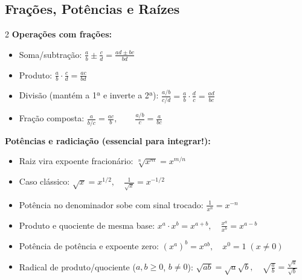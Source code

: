 \documentclass[10pt,a4paper]{article}
\begin{document}
\subsection{Frações, Potências e Raízes}
\begin{multicols}{2}
\textbf{Operações com frações:}
\begin{itemize}
    \item Soma/subtração: $\displaystyle \frac{a}{b} \pm \frac{c}{d} = \frac{ad \pm bc}{bd}$
    \item Produto: $\displaystyle \frac{a}{b} \cdot \frac{c}{d} = \frac{ac}{bd}$
    \item Divisão (mantém a 1ª e inverte a 2ª):
          $\displaystyle \frac{a/b}{c/d} = \frac{a}{b}\cdot\frac{d}{c} = \frac{ad}{bc}$
    \item Fração composta:
          $\displaystyle \frac{a}{b/c} = \frac{ac}{b}, \qquad \frac{a/b}{c} = \frac{a}{bc}$
\end{itemize}

\columnbreak

\textbf{Potências e radiciação (essencial para integrar!):}
\begin{itemize}
    \item Raiz vira expoente fracionário: $\displaystyle \sqrt[n]{x^m} = x^{m/n}$
    \item Caso clássico: $\displaystyle \sqrt{x} = x^{1/2}, \quad \frac{1}{\sqrt{x}} = x^{-1/2}$
    \item Potência no denominador sobe com sinal trocado: $\displaystyle \frac{1}{x^n} = x^{-n}$
    \item Produto e quociente de mesma base:
          $\displaystyle x^a \cdot x^b = x^{a+b}, \quad \frac{x^a}{x^b} = x^{a-b}$
    \item Potência de potência e expoente zero:
          $\displaystyle (x^a)^b = x^{ab}, \quad x^0 = 1 \; (x \neq 0)$
    \item Radical de produto/quociente ($a,b \ge 0$, $b\neq 0$):
          $\displaystyle \sqrt{ab} = \sqrt{a}\sqrt{b}, \quad \sqrt{\frac{a}{b}} = \frac{\sqrt{a}}{\sqrt{b}}$
\end{itemize}
\end{multicols}
\end{document}
